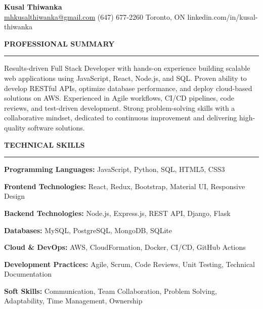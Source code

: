 \documentclass[10pt,letterpaper]{article}
\begin{document}
\begin{center}
{\LARGE\textbf{Kusal Thiwanka}}\\[3pt]
\href{mailto:mhkusalthiwanka@gmail.com}{mhkusalthiwanka@gmail.com}\hspace{2em}%
(647) 677{-}2260\hspace{2em}%
Toronto, ON\hspace{2em}
linkedin.com/in/kusal-thiwanka
\end{center}

\vspace{6pt}

\textbf{PROFESSIONAL SUMMARY}\\[-8pt]
\noindent\rule{\textwidth}{1pt}

\vspace{-2pt}

Results-driven Full Stack Developer with hands-on experience building scalable web applications using JavaScript, React, Node.js, and SQL. Proven ability to develop RESTful APIs, optimize database performance, and deploy cloud-based solutions on AWS. Experienced in Agile workflows, CI/CD pipelines, code reviews, and test-driven development. Strong problem-solving skills with a collaborative mindset, dedicated to continuous improvement and delivering high-quality software solutions.

\vspace{8pt}

\textbf{TECHNICAL SKILLS}\\[-8pt]
\noindent\rule{\textwidth}{1pt}

\vspace{-2pt}

\textbf{Programming Languages:} JavaScript, Python, SQL, HTML5, CSS3

\textbf{Frontend Technologies:} React, Redux, Bootstrap, Material UI, Responsive Design

\textbf{Backend Technologies:} Node.js, Express.js, REST API, Django, Flask

\textbf{Databases:} MySQL, PostgreSQL, MongoDB, SQLite

\textbf{Cloud \& DevOps:} AWS, CloudFormation, Docker, CI/CD, GitHub Actions

\textbf{Development Practices:} Agile, Scrum, Code Reviews, Unit Testing, Technical Documentation

\textbf{Soft Skills:} Communication, Team Collaboration, Problem Solving, Adaptability, Time Management, Ownership

\vspace{8pt}
\end{document}
